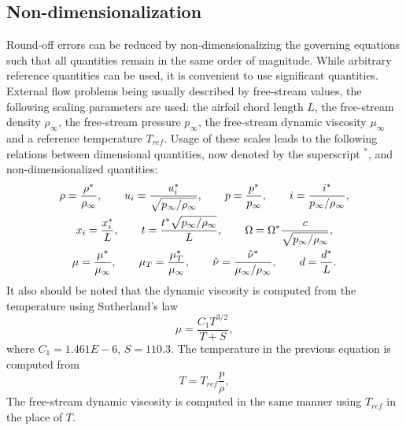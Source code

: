 \subsection{Non-dimensionalization}
\label{syn:nondim}
%
Round-off errors can be reduced by non-dimensionalizing the governing equations such that all quantities remain in the same order of magnitude. While arbitrary reference quantities can be used, it is convenient to use significant quantities. External flow problems being usually described by free-stream values, the following scaling parameters are used: the airfoil chord length $L$, the free-stream density $\rho_\infty$, the free-stream pressure $p_\infty$, the free-stream dynamic viscosity $\mu_\infty$ and a reference temperature $T_{ref}$. Usage of these scales leads to the following relations between dimensional quantities, now denoted by the superscript $^*$, and non-dimensionalized quantities:
\begin{gather*}
    \rho = \frac{\rho^*}{\rho_\infty}, \quad\quad
    u_i = \frac{u_i^*}{\sqrt{p_\infty/\rho_\infty}}, \quad\quad
    p = \frac{p^*}{p_\infty}, \quad\quad
    i = \frac{i^*}{p_\infty/\rho_\infty}, \\
    x_i = \frac{x_i^*}{L}, \quad\quad
    t = \frac{t^*\sqrt{p_\infty/\rho_\infty}}{L}, \quad\quad
    \Omega = \Omega^*\frac{c}{\sqrt{p_\infty/\rho_\infty}}, \\
    \mu = \frac{\mu^*}{\mu_\infty}, \quad\quad
    \mu_T = \frac{\mu^*_T}{\mu_\infty}, \quad\quad
    \sa = \frac{\sa^*}{\mu_\infty/\rho_\infty}, \quad\quad
    d = \frac{d^*}{L}.
\end{gather*}
It also should be noted that the dynamic viscosity is computed from the temperature using Sutherland's law
\begin{equation*}
    \mu = \frac{C_1 T^{3/2}}{T + S},
\end{equation*}
where $C_1 = 1.461E-6$, $S = 110.3$. The temperature in the previous equation is computed from
\begin{equation*}
    T = T_{ref} \frac{p}{\rho},
\end{equation*}
The free-stream dynamic viscosity is computed in the same manner using $T_{ref}$ in the place of $T$.

